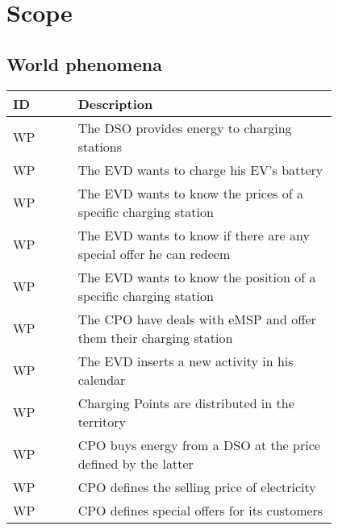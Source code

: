 \section{Scope}
\label{sec:scope}

\subsection{World phenomena}
\label{subsec:world_phenomena}%
\setcounter{wp}{1}
\newcommand{\cwp}{\thewp\stepcounter{wp}}
\begin{table}[H]
    \begin{center}
        \begin{longtable}{ |l|p{0.8\linewidth}| }
            \hline
            \textbf{ID} & \textbf{Description}                                               \\
            \hline
            WP\cwp      & The DSO provides energy to charging stations                       \\
            \hline
            WP\cwp      & The EVD wants to charge his EV's battery                           \\
            \hline
            WP\cwp      & The EVD wants to know the prices of a specific charging station    \\
            \hline
            WP\cwp      & The EVD wants to know if there are any special offer he can redeem \\
            \hline
            WP\cwp      & The EVD wants to know the position of a specific charging station  \\
            \hline
            WP\cwp      & The CPO have deals with eMSP and offer them their charging station \\
            \hline
            WP\cwp      & The EVD inserts a new activity in his calendar                     \\
            \hline
            WP\cwp      & Charging Points are distributed in the territory                   \\
            \hline
            WP\cwp      & CPO buys energy from a DSO at the price defined by the latter      \\
            \hline
            WP\cwp      & CPO defines the selling price of electricity                       \\
            \hline
            WP\cwp      & CPO defines special offers for its customers                       \\
            \hline

\end{longtable}
\end{center}
\end{table}
